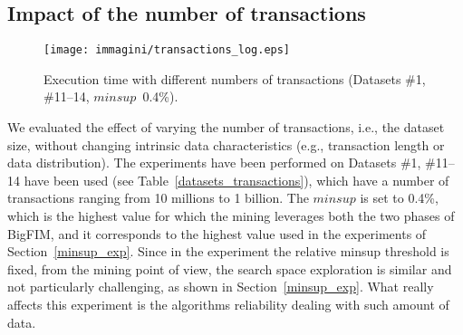 



\subsection{Impact of the number of transactions}
\label{transaction_exp}

\begin{figure}[!t]
\texttt{[image: immagini/transactions\_log.eps]}
\caption{Execution time with different numbers of transactions
 (Datasets \#1, \#11--14,
 $minsup$~0.4\%).}
\label{transactions}
\end{figure}

We evaluated the effect of varying the number of transactions,
i.e., the dataset size, without changing intrinsic data characteristics (e.g., 
transaction length or data distribution).
The experiments have been performed on Datasets \#1, \#11--14 have been used
(see Table~\ref{datasets_transactions}),
which have a number of transactions
ranging from 10 millions to 1 billion.
The $minsup$ is set to 0.4\%,
which is the highest value for which the mining leverages both the two phases of
BigFIM, and it corresponds to the highest value used
in the experiments of Section~\ref{minsup_exp}.
Since in the experiment the relative minsup threshold is fixed, from the mining point of view, the search space exploration is similar and not particularly challenging, as shown in Section~\ref{minsup_exp}. What really affects this experiment is the algorithms reliability dealing with such amount of data.

